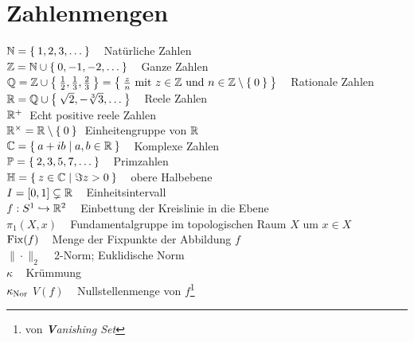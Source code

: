 \section*{Zahlenmengen}
$\mathbb{N} = \Set{1, 2, 3, \dots} \;\;\;$ Natürliche Zahlen\\
$\mathbb{Z} = \mathbb{N} \cup \Set{0, -1, -2, \dots} \;\;\;$ Ganze Zahlen\\
$\mathbb{Q} = \mathbb{Z} \cup \Set{\frac{1}{2}, \frac{1}{3}, \frac{2}{3}} = \Set{\frac{z}{n} \text{ mit } z \in \ensuremath{\mathbb{Z}}\text{ und } n \in \ensuremath{\mathbb{Z}}\setminus \Set{0}} \;\;\;$ Rationale Zahlen\\
$\mathbb{R} = \mathbb{Q} \cup \Set{\sqrt{2}, -\sqrt[3]{3}, \dots}\;\;\;$ Reele Zahlen\\
$\mathbb{R}^+\;$ Echt positive reele Zahlen\\
$\mathbb{R}^\times = \mathbb{R} \setminus \Set{0} \;$ Einheitengruppe von $\mathbb{R}$\\
$\mathbb{C} = \Set{a+ib|a,b \in \ensuremath{\mathbb{R}}}\;\;\;$ Komplexe Zahlen\\
$\mathbb{P} = \Set{2, 3, 5, 7, \dots}\;\;\;$ Primzahlen\\
$\mathbb{H} = \Set{z \in \ensuremath{\mathbb{C}}| \Im{z} > 0}\;\;\;$ obere Halbebene\\
$I = [0,1] \subsetneq \mathbb{R}\;\;\;$ Einheitsintervall\\

$f:S^1 \hookrightarrow \mathbb{R}^2\;\;\;$ Einbettung der Kreislinie in die Ebene\\
$\pi_1(X,x)\;\;\;$ Fundamentalgruppe im topologischen Raum $X$ um $x \in X$\\
$\operatorname{Fix}(f)\;\;\;$ Menge der Fixpunkte der Abbildung $f$\\
$\|\cdot\|_2\;\;\;$ 2-Norm; Euklidische Norm\\
$\kappa\;\;\;$ Krümmung\\
$\kappa_{\textnormal{Nor}}$
$V(f)\;\;\;$ Nullstellenmenge von $f$\footnote{von \textit{\textbf{V}anishing Set}}

